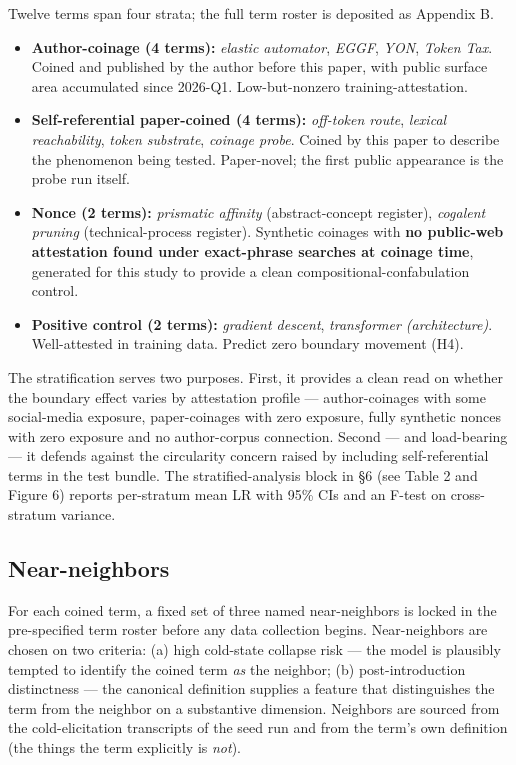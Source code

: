 \documentclass[11pt,a4paper]{article}
\begin{document}
Twelve terms span four strata; the full term roster is deposited as Appendix B.

\begin{itemize}
  \item \textbf{Author-coinage (4 terms):} \textit{elastic automator}, \textit{EGGF}, \textit{YON}, \textit{Token Tax}. Coined and published by the author before this paper, with public surface area accumulated since 2026-Q1. Low-but-nonzero training-attestation.
  \item \textbf{Self-referential paper-coined (4 terms):} \textit{off-token route}, \textit{lexical reachability}, \textit{token substrate}, \textit{coinage probe}. Coined by this paper to describe the phenomenon being tested. Paper-novel; the first public appearance is the probe run itself.
  \item \textbf{Nonce (2 terms):} \textit{prismatic affinity} (abstract-concept register), \textit{cogalent pruning} (technical-process register). Synthetic coinages with \textbf{no public-web attestation found under exact-phrase searches at coinage time}, generated for this study to provide a clean compositional-confabulation control.
  \item \textbf{Positive control (2 terms):} \textit{gradient descent}, \textit{transformer (architecture)}. Well-attested in training data. Predict zero boundary movement (H4).
\end{itemize}

The stratification serves two purposes. First, it provides a clean read on whether the boundary effect varies by attestation profile --- author-coinages with some social-media exposure, paper-coinages with zero exposure, fully synthetic nonces with zero exposure and no author-corpus connection. Second --- and load-bearing --- it defends against the circularity concern raised by including self-referential terms in the test bundle. The stratified-analysis block in \S6 (see Table 2 and Figure 6) reports per-stratum mean LR with 95\% CIs and an F-test on cross-stratum variance.

\subsection{Near-neighbors}

For each coined term, a fixed set of three named near-neighbors is locked in the pre-specified term roster before any data collection begins. Near-neighbors are chosen on two criteria: (a) high cold-state collapse risk --- the model is plausibly tempted to identify the coined term \textit{as} the neighbor; (b) post-introduction distinctness --- the canonical definition supplies a feature that distinguishes the term from the neighbor on a substantive dimension. Neighbors are sourced from the cold-elicitation transcripts of the seed run and from the term's own definition (the things the term explicitly is \textit{not}).
\end{document}
